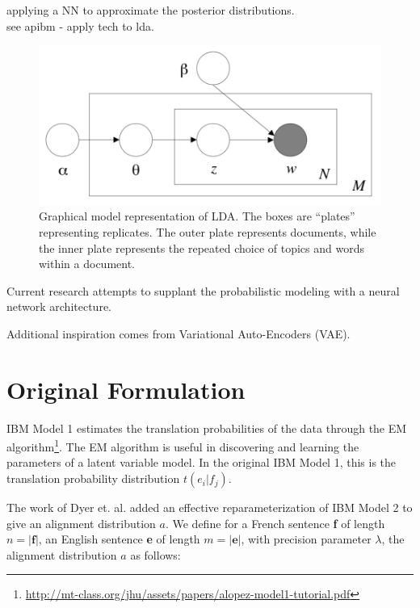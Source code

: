 \documentclass[twoside,twocolumn]{article}
\begin{document}
applying a NN to approximate the posterior distributions.\\
see apibm - apply tech to lda.\\
\cite{blei2003latent}
\cite{kingma2013auto}

\begin{figure}
\centering
\includegraphics[scale=0.5]{LDADiagram}
\caption{Graphical model representation of LDA. The boxes are “plates” representing replicates. The outer plate represents documents, while the inner plate represents the repeated choice of topics and words within a document. }
\end{figure}

Current research attempts to supplant the probabilistic modeling with a neural network architecture. 

Additional inspiration comes from Variational Auto-Encoders (VAE).

\section{Original Formulation}

IBM Model 1 estimates the translation probabilities of the data through the EM algorithm\footnote{\url{http://mt-class.org/jhu/assets/papers/alopez-model1-tutorial.pdf}}. The EM algorithm is useful in discovering and learning the parameters of a latent variable model. In the original IBM Model 1, this is the translation probability distribution $t(e_i|f_j)$.

The work of Dyer et. al. \cite{dyer2013simple} added an effective reparameterization of IBM Model 2 to give an alignment distribution $a$. We define for a French sentence \textbf{f} of length $n = |\textbf{f}|$, an English sentence \textbf{e} of length $m=|\textbf{e}|$, with precision parameter $\lambda$, the alignment distribution $a$ as follows:
\end{document}
